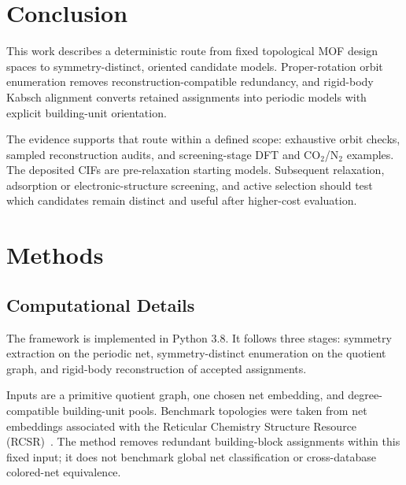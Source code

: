 \documentclass[pdflatex,sn-mathphys-num]{sn-jnl}
\theoremstyle{thmstyleone}%
\begin{document}
\section*{Conclusion}
This work describes a deterministic route from fixed topological MOF design spaces to symmetry-distinct, oriented candidate models. Proper-rotation orbit enumeration removes reconstruction-compatible redundancy, and rigid-body Kabsch alignment converts retained assignments into periodic models with explicit building-unit orientation.

The evidence supports that route within a defined scope: exhaustive orbit checks, sampled reconstruction audits, and screening-stage DFT and CO$_2$/N$_2$ examples. The deposited CIFs are pre-relaxation starting models. Subsequent relaxation, adsorption or electronic-structure screening, and active selection should test which candidates remain distinct and useful after higher-cost evaluation.

\section*{Methods}
\subsection*{Computational Details}
The framework is implemented in Python 3.8. It follows three stages: symmetry extraction on the periodic net, symmetry-distinct enumeration on the quotient graph, and rigid-body reconstruction of accepted assignments.

Inputs are a primitive quotient graph, one chosen net embedding, and degree-compatible building-unit pools. Benchmark topologies were taken from net embeddings associated with the Reticular Chemistry Structure Resource (RCSR)~\cite{okeeffe2008rcsr}. The method removes redundant building-block assignments within this fixed input; it does not benchmark global net classification or cross-database colored-net equivalence.
\end{document}
